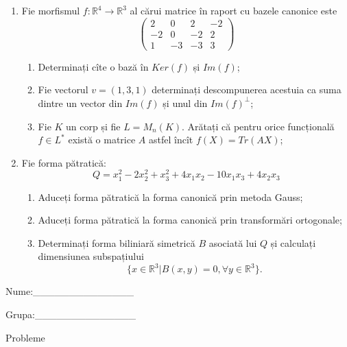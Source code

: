\documentclass{article}
\begin{document}
\begin{enumerate}
 \item Fie morfismul $f:\mathbb{R}^4 \to \mathbb{R}^3$ al cărui matrice în raport cu bazele canonice este
$$\begin{pmatrix}
2&0&2&-2\\
-2&0&-2&2\\
1&-3&-3&3
\end{pmatrix}$$

\begin{enumerate}
\item Determinați cîte o bază în $Ker(f)$ și $Im(f)$;
\item Fie vectorul $v=(1,3,1)$ determinați descompunerea acestuia ca suma dintre un vector din $Im(f)$ și unul din $Im(f)^\perp$;
\item Fie $K$ un corp și fie $L=M_n(K)$. Arătați că pentru orice funcțională $f \in L^*$ există o matrice $A$ astfel încît $f(X)=Tr(AX)$;
\end{enumerate}
\item Fie forma pătratică:
$$Q= x_1^2-2x_2^2+x_3^2+4x_1x_2-10x_1x_3+4x_2x_3$$

\begin{enumerate}
\item Aduceți forma pătratică la forma canonică prin metoda Gauss;
\item Aduceți forma pătratică la forma canonică prin transformări ortogonale;
\item Determinați forma biliniară simetrică $B$ asociată lui $Q$ și calculați dimensiunea subspațiului
$$\{x \in \mathbb{R}^3 | B(x,y)=0,\forall y \in \mathbb{R}^3\}.$$

\end{enumerate}
\end{enumerate}
\newpage
\begin{flushright}
Nume:\_\_\_\_\_\_\_\_\_\_\_\_\_\_
 
 
Grupa:\_\_\_\_\_\_\_\_\_\_\_\_\_\_
\end{flushright}
\begin{center}
\vspace{2cm}
{\Large Probleme}
\vspace{2cm}
\end{center}
\end{document}
